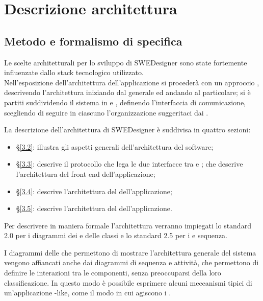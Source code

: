\section{Descrizione architettura }
	\subsection{Metodo e formalismo di specifica}
Le scelte architetturali per lo sviluppo di SWEDesigner sono state fortemente influenzate dallo stack tecnologico utilizzato. \\

Nell’esposizione dell’architettura dell'applicazione si procederà con un approccio , descrivendo l'architettura iniziando dal generale ed andando al particolare; si è partiti suddividendo il sistema in  e , definendo l'interfaccia di comunicazione, scegliendo di seguire in ciascuno l'organizzazione suggeritaci dai . 

La descrizione dell’architettura di SWEDesigner è suddivisa in quattro sezioni:
\begin{itemize}
\item \S\ref{3.2}: illustra gli aspetti generali dell’architettura del software;
\item \S\ref{3.3}: descrive il protocollo che lega le due interfacce tra  e ;
che descrive l’architettura del front end dell’applicazione;
\item \S\ref{3.4}: descrive l’architettura del  dell’applicazione;
\item \S\ref{3.5}: descrive l’architettura del  dell’applicazione.

\end{itemize}

Per descrivere in maniera formale l'architettura verranno impiegati lo standard  2.0 per i diagrammi dei  e delle classi e lo standard  2.5 per i  e sequenza.

I diagrammi delle  che permettono di mostrare l'architettura generale del sistema vengono affiancati anche dai diagrammi di sequenza e attività, che permettono di definire le interazioni tra le componenti, senza preoccuparsi della loro classificazione.
In questo modo è possibile esprimere alcuni meccanismi tipici di un’applicazione
-like, come il modo in cui agiscono i .


